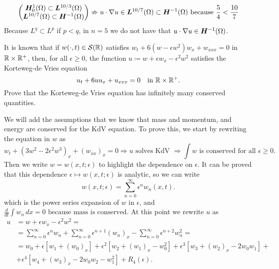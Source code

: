 \begin{itemize}
    \[
        \begin{pmatrix*}
            \bm{H}^1_0(\Omega) \subset \bm{L}^{10/3}{(\Omega)}  \\
            \bm{L}^{10/7}(\Omega) \subset \bm{H}^{-1}(\Omega)
        \end{pmatrix*}
        \nRightarrow u \cdot \grad u \in \bm{L}^{10/7}(\Omega) \subset \bm{H}^{-1}(\Omega) \text{ because } \frac{5}{4} < \frac{10}{7}
    \]
    Because \(L^q \subset L^p\) if \(p < q\), in \(n = 5\) we do not have that \(u \cdot \nabla u \in \bm{H}^{-1}(\Omega)\).
\end{itemize}

\newpage
\begin{exercise}
    It is known that if \(w(\cdot, t) \in \mathcal{S}(\mathbb{R})\) satisfies \(w_t + 6(w - \epsilon w^2)w_x + w_{xxx} = 0\) in \(\mathbb{R} \times \mathbb{R}^+\), then, for all \(\epsilon \geq 0\),
    the function \(u \coloneqq w + \epsilon w_x - \epsilon^2 w^2\) satisfies the Korteweg-de Vries equation
    \[
        u_t + 6uu_x + u_{xxx} = 0 \quad \text{in } \mathbb{R} \times \mathbb{R}^+.
    \]
    Prove that the Korteweg-de Vries equation has infinitely many conserved quantities.
\end{exercise}
We will add the assumptions that we know that mass and momentum, and energy are conserved for the KdV equation. 
To prove this, we start by rewriting the equation in \(w\) as
\[
    w_t + \left(3w^2 - 2\epsilon^2 w^3\right)_x + \left(w_{xx}\right)_x = 0 \Rightarrow u \text{ solves KdV } \Rightarrow \int w \text{ is conserved for all } \epsilon \geq 0.
\]
Then we write \(w = w(x, t; \epsilon)\) to highlight the dependence on \(\epsilon\). 
It can be proved that this dependence \(\epsilon \mapsto w(x, t; \epsilon)\) is analytic, so we can write
\[
    w(x, t; \epsilon) = \sum_{n=0}^\infty \epsilon^n w_n(x, t).
\]
which is the power series expansion of \(w\) in \(\epsilon\), and 
\(
    \frac{d}{dt} \int w_n \, dx = 0  \text{ because mass is conserved.}
\)
At this point we rewrite \(u\) as
\begin{align*}
    u &= w + \epsilon w_x - \epsilon^2 w^2 = \\
    &= \sum_{n=0}^\infty \epsilon^n w_n + \sum_{n=0}^\infty \epsilon^{n+1} (w_{n})_x - \sum_{n=0}^\infty \epsilon^{n+2} w_n^2 = \\
    &= w_0 + \epsilon \left[w_1 + (w_0)_x\right] + \epsilon^2 \left[w_2 + (w_1)_x - w_0^2\right] + \epsilon^3 \left[w_3 + (w_2)_x - 2w_0 w_1\right] + \\
    &+ \epsilon^4 \left[w_4 + (w_3)_x - 2w_0 w_2 - w_1^2\right] + R_4(\epsilon).
\end{align*}
